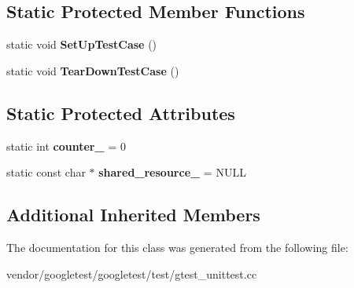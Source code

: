 \subsection*{Static Protected Member Functions}
\begin{DoxyCompactItemize}
\item 
\mbox{\label{classtesting_1_1_set_up_test_case_test_a50732abc0bcb3725e6dfd6a2d487e944}} 
static void {\bfseries Set\+Up\+Test\+Case} ()
\item 
\mbox{\label{classtesting_1_1_set_up_test_case_test_abdc133cd161ff2fa317f489da9bdccf3}} 
static void {\bfseries Tear\+Down\+Test\+Case} ()
\end{DoxyCompactItemize}
\subsection*{Static Protected Attributes}
\begin{DoxyCompactItemize}
\item 
\mbox{\label{classtesting_1_1_set_up_test_case_test_a5b6e811128d35389be49f6569bf93817}} 
static int {\bfseries counter\+\_\+} = 0
\item 
\mbox{\label{classtesting_1_1_set_up_test_case_test_a904e77fd9a628b6a9aca0280665fd040}} 
static const char $\ast$ {\bfseries shared\+\_\+resource\+\_\+} = N\+U\+LL
\end{DoxyCompactItemize}
\subsection*{Additional Inherited Members}


The documentation for this class was generated from the following file\+:\begin{DoxyCompactItemize}
\item 
vendor/googletest/googletest/test/gtest\+\_\+unittest.\+cc\end{DoxyCompactItemize}
